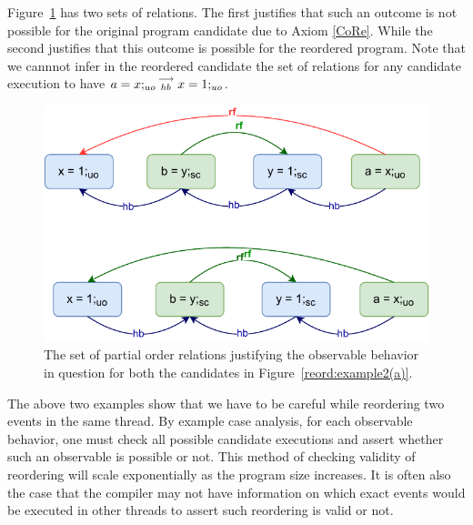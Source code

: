         
        Figure~\ref{reord:example2(b)} has two sets of relations. 
        The first justifies that such an outcome is not possible for the original program candidate due to Axiom \ref{CoRe}. 
        While the second justifies that this outcome is possible for the reordered program.
        Note that we cannnot infer in the reordered candidate the set of relations for any candidate execution to have $a=x;_{uo}\stackrel{\longrightarrow}{_{hb}}x=1;_{uo}$. 
        \begin{figure}[H]
            \centering
            \includegraphics[scale=0.7]{5.InstructionReordering/0.Intro/ReorderingExample2(b).pdf}
            \caption{The set of partial order relations justifying the observable behavior in question for both the candidates in Figure~\ref{reord:example2(a)}.} 
            \label{reord:example2(b)}
        \end{figure}

        The above two examples show that we have to be careful while reordering two events in the same thread. 
        By example case analysis, for each observable behavior, one must check all possible candidate executions and assert whether such an observable is possible or not. 
        This method of checking validity of reordering will scale exponentially as the program size increases. 
        It is often also the case that the compiler may not have information on which exact events would be executed in other threads to assert such reordering is valid or not. 

    
    
    
    
    